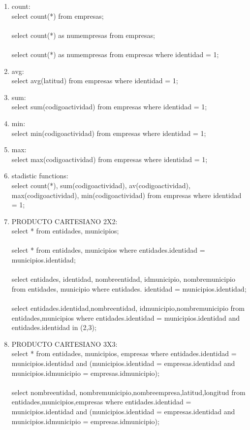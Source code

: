 \documentclass[10pt]{article}         %
\begin{document}
\begin{enumerate}
	\item count:\\
		select count(*) from empresas;\\
		\\
		select count(*) as numempresas from empresas;\\
		\\
		select count(*) as numempresas from empresas where identidad = 1;

	\item avg:\\
		select avg(latitud) from empresas where identidad = 1;

	\item sum:\\
		select sum(codigoactividad) from empresas where identidad = 1;

	\item min:\\
		select min(codigoactividad) from empresas where identidad = 1;

	\item max:\\
		select max(codigoactividad) from empresas where identidad = 1;

	\item stadistic functions:\\
		select count(*), sum(codigoactividad), av(codigoactividad), max(codigoactividad),
min(codigoactividad) from empresas where identidad = 1;

	\item PRODUCTO CARTESIANO 2X2:\\
		select * from entidades, municipios;\\
		\\
		select * from entidades, municipios where entidades.identidad = municipios.identidad;\\
		\\
		select entidades, identidad, nombreentidad, idmunicipio, nombremunicipio from entidades, municipio where entidades. identidad = municipios.identidad;\\
		\\
		select entidades.identidad,nombreentidad, idmunicipio,nombremunicipio from entidades,municipios where entidades.identidad = municipios.identidad and entidades.identidad in (2,3);
	
	\item PRODUCTO CARTESIANO 3X3:\\
		select * from entidades, municipios, empresas where entidades.identidad = municipios.identidad and (municipios.identidad = empresas.identidad and municipios.idmunicipio = empresas.idmunicipio);\\
\\
select nombreentidad, nombremunicipio,nombreempresa,latitud,longitud from entidades,municipios,empresas where entidades.identidad = municipios.identidad and (municipios.identidad = empresas.identidad and municipios.idmunicipio = empresas.idmunicipio);


\end{enumerate}
\end{document}
